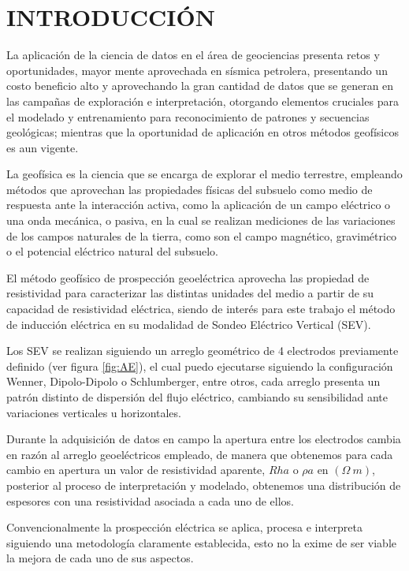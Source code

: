 \chapter{INTRODUCCIÓN}

La aplicación de la ciencia de datos en el área de geociencias presenta retos y oportunidades, mayor mente aprovechada en sísmica petrolera, presentando un costo beneficio alto y aprovechando la gran cantidad de datos que se generan en las campañas de exploración e interpretación, otorgando elementos cruciales para el modelado y entrenamiento para reconocimiento de patrones y secuencias geológicas; mientras que la oportunidad de aplicación en otros métodos geofísicos es aun vigente. 

La geofísica es la ciencia que se encarga de explorar el medio terrestre, empleando métodos que aprovechan las propiedades físicas del subsuelo como medio de respuesta ante la interacción activa, como la aplicación de un campo eléctrico o una onda mecánica,  o pasiva, en la cual se realizan mediciones de las variaciones de los campos naturales de la tierra, como son el campo magnético, gravimétrico o el potencial eléctrico natural del subsuelo.

El método geofísico de prospección geoeléctrica aprovecha las propiedad de resistividad para caracterizar las distintas unidades del medio a partir de su capacidad de resistividad eléctrica, siendo de interés para este trabajo el método de inducción eléctrica en su modalidad de Sondeo Eléctrico Vertical (SEV).

Los SEV se realizan siguiendo un arreglo geométrico de 4 electrodos previamente definido (ver figura \ref{fig:AE}), el cual puedo ejecutarse siguiendo la configuración Wenner, Dipolo-Dipolo o Schlumberger, entre otros, cada arreglo presenta un patrón distinto de dispersión del flujo eléctrico, cambiando su sensibilidad ante variaciones verticales u horizontales. 

Durante la adquisición de datos en campo la apertura entre los electrodos cambia en razón al arreglo geoeléctricos empleado, de manera que obtenemos para cada cambio en apertura un valor de resistividad aparente, $Rha$ o $\rho a$ en $(\varOmega\ m)$, posterior al proceso de interpretación y modelado, obtenemos una distribución de espesores con una resistividad asociada a cada uno de ellos.

Convencionalmente la prospección eléctrica se aplica, procesa e interpreta siguiendo una metodología claramente establecida, esto no la exime de ser viable la mejora de cada uno de sus aspectos.

